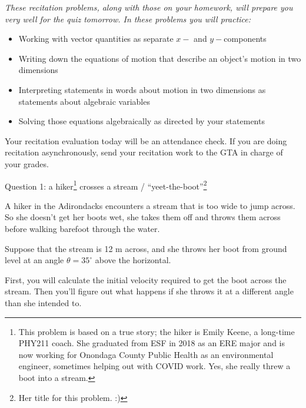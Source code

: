 \documentclass[12pt]{article}
\newcommand{\BI}{\begin{itemize}}
\newcommand{\EI}{\end{itemize}}
\begin{document}
\Large
\centerline{}
\normalsize
\centerline{}

\it These recitation problems, along with those on your homework, will prepare you very well for the quiz tomorrow. In these problems you will practice:

\rm

\BI
\item Working with vector quantities as separate $x-$ and $y-$components
\item Writing down the equations of motion that describe an object's motion in two dimensions
\item Interpreting statements in words about motion in two dimensions as statements about algebraic variables
\item Solving those equations algebraically as directed by your statements
\EI


Your recitation evaluation today will be an attendance check. If you are doing recitation asynchronously, send your recitation work to the GTA in charge of your grades.

\newpage

\rm 


\centerline{\Large Question 1: a hiker\footnote{\noindent This problem is based on a true story; the hiker is Emily Keene, a long-time PHY211 coach. She graduated from ESF in 2018 as an ERE major and is now working for Onondaga County Public Health as an environmental engineer, sometimes helping out with COVID work. Yes, she really threw a boot into a stream.} crosses a stream / ``yeet-the-boot''\footnote{\noindent Her title for this problem. :) }}     
A hiker in the Adirondacks encounters a stream that is too wide to jump across. So she doesn't get her boots wet, she takes them off and throws them across before walking barefoot through the water. 

Suppose that the stream is 12 m across, and she throws her boot from
ground level at an angle $\theta = 35^\circ$ above the horizontal.

First, you will calculate the initial velocity required to get the boot across the stream. Then you'll figure out what happens if she throws it at a different angle than she intended to.
\end{document}
